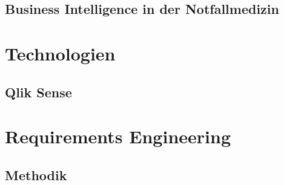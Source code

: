 \subsection{Business Intelligence in der Notfallmedizin}

\section{Technologien}
\subsection{Qlik Sense}

\section{Requirements Engineering}
\subsection{Methodik}